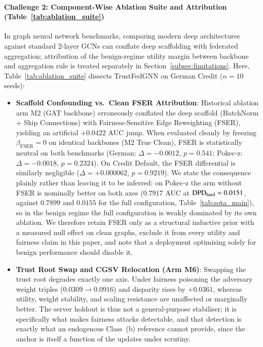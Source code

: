 \paragraph{Challenge 2: Component-Wise Ablation Suite and Attribution (Table~\ref{tab:ablation_suite})}
In graph neural network benchmarks, comparing modern deep architectures against standard 2-layer GCNs can conflate deep scaffolding with federated aggregation; attribution of the benign-regime utility margin between backbone and aggregation rule is treated separately in Section~\ref{subsec:limitations}. Here, Table~\ref{tab:ablation_suite} dissects TrustFedGNN on German Credit ($n=10$ seeds):
\begin{itemize}[leftmargin=*]
    \item \textbf{Scaffold Confounding vs.\ Clean FSER Attribution}: Historical ablation arm M2 (GAT backbone) erroneously conflated the deep scaffold (BatchNorm + Skip Connections) with Fairness-Sensitive Edge Reweighting (FSER), yielding an artificial $+0.0422$ AUC jump. When evaluated cleanly by freezing $\beta_{\text{FSER}} = 0$ on identical backbones (M2 True Clean), FSER is statistically neutral on both benchmarks (German: $\Delta = -0.0012$, $p = 0.541$; Pokec-z: $\Delta = -0.0018$, $p = 0.2324$). On Credit Default, the FSER differential is similarly negligible ($\Delta = +0.000062$, $p = 0.9219$). We state the consequence plainly rather than leaving it to be inferred: on Pokec-z the arm without FSER is nominally better on both axes ($0.7917$ AUC at $\mathrm{DPD}_{\mathrm{hard}} = 0.0151$, against $0.7899$ and $0.0155$ for the full configuration, Table~\ref{tab:sota_main}), so in the benign regime the full configuration is weakly dominated by its own ablation. We therefore retain FSER only as a structural inductive prior with a measured null effect on clean graphs, exclude it from every utility and fairness claim in this paper, and note that a deployment optimising solely for benign performance should disable it.
    \item \textbf{Trust Root Swap and CGSV Relocation (Arm M6)}: Swapping the trust root degrades exactly one axis. Under fairness poisoning the adversary weight triples ($0.0309 \to 0.0916$) and disparity rises by $+0.0361$, whereas utility, weight stability, and scaling resistance are unaffected or marginally better. The server holdout is thus not a general-purpose stabiliser; it is specifically what makes fairness attacks detectable, and that detection is exactly what an endogenous Class~(b) reference cannot provide, since the anchor is itself a function of the updates under scrutiny.

\end{itemize}
